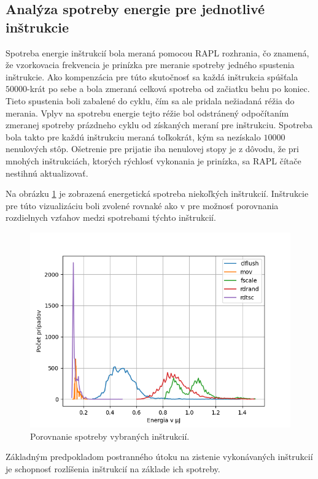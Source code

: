 \subsection{Analýza spotreby energie pre jednotlivé inštrukcie}
Spotreba energie inštrukcií bola meraná pomocou RAPL rozhrania, čo znamená, že vzorkovacia frekvencia je prinízka pre meranie spotreby jedného spustenia inštrukcie.
Ako kompenzácia pre túto skutočnosť sa každá inštrukcia spúšťala $50000$-krát po sebe a bola zmeraná celková spotreba od začiatku behu po koniec. Tieto spustenia
boli zabalené do cyklu, čím sa ale pridala nežiadaná réžia do merania. Vplyv na spotrebu energie tejto réžie bol odstránený odpočítaním zmeranej spotreby
prázdneho cyklu od získaných meraní pre inštrukciu. Spotreba bola takto pre každú inštrukciu meraná toľkokrát, kým sa nezískalo $10000$ nenulových stôp.
Ošetrenie pre prijatie iba nenulovej stopy je z dôvodu, že pri mnohých inštrukciách, ktorých rýchlosť vykonania je prinízka, sa RAPL čítače nestihnú aktualizovať.

Na obrázku \ref{img:instruction_comparison} je zobrazená energetická spotreba niekoľkých inštrukcií. Inštrukcie pre túto vizualizáciu boli zvolené rovnaké
ako v \cite{Platypus} pre možnosť porovnania rozdielnych vzťahov medzi spotrebami týchto inštrukcií.

\begin{figure}\label{img:instruction_comparison}
  \centering
  \includegraphics[scale=0.7]{./obrazky-figures/instr_comparison.png}
  \caption{Porovnanie spotreby vybraných inštrukcií.}
\end{figure}

Základným predpokladom postranného útoku na zistenie vykonávaných inštrukcií je schopnosť rozlíšenia inštrukcií na základe ich spotreby.

